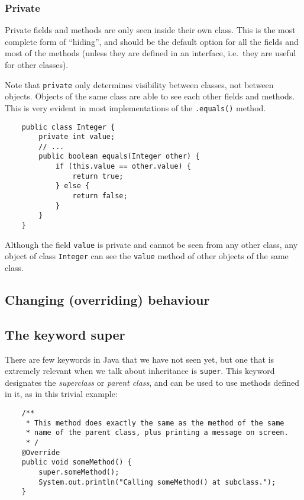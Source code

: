 {\subsubsection{Private}
\label{sec:private}

Private fields and methods are only seen inside their own class. This
is the most complete form of ``hiding'', and should be the default
option for all the fields and most of the methods (unless they are
defined in an interface, i.e.~they are useful for other classes). 

Note that \verb+private+ only determines visibility between classes,
not between objects. Objects of the same class are able to see each
other fields and methods. This is very evident in most implementations
of the \verb+.equals()+ method. 

\begin{verbatim}
    public class Integer {
        private int value;
        // ...
        public boolean equals(Integer other) {
            if (this.value == other.value) {
                return true;
            } else {
                return false;
            }
        }
    }
\end{verbatim}

Although the field \verb+value+ is private and cannot be seen from any
other class, any object of class \verb+Integer+ can see the
\verb+value+ method of other objects of the same class. 

\subsection{Changing (overriding) behaviour}
\label{sec:chang-overr-behav}


\subsection{The keyword super}
\label{sec:keyword-super}

There are few keywords in Java that we have not seen yet, but one that
is extremely relevant when we talk about inheritance is
\verb+super+. This keyword designates the \emph{superclass} or
\emph{parent class}, and can be used to use methods defined in it, as
in this trivial example: 

\begin{verbatim}
    /**
     * This method does exactly the same as the method of the same
     * name of the parent class, plus printing a message on screen. 
     * /
    @Override
    public void someMethod() {
        super.someMethod();
        System.out.println("Calling someMethod() at subclass.");
    }
\end{verbatim}

}
